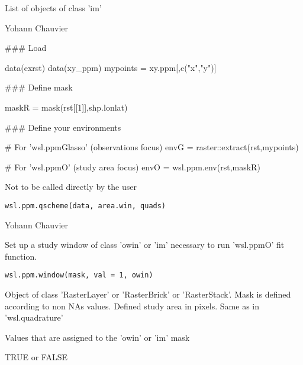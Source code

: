 \documentclass[a4paper]{book}
\begin{document}
%
\begin{Value}
List of objects of class 'im'
\end{Value}
%
\begin{Author}\relax
Yohann Chauvier
\end{Author}
%
\begin{Examples}
\begin{ExampleCode}

### Load

data(exrst)
data(xy_ppm)
mypoints = xy.ppm[,c("x","y")]

### Define mask

maskR = mask(rst[[1]],shp.lonlat)

### Define your environments

   # For 'wsl.ppmGlasso' (observations focus)
envG = raster::extract(rst,mypoints)

   # For 'wsl.ppmO' (study area focus)
envO = wsl.ppm.env(rst,maskR)

\end{ExampleCode}
\end{Examples}
%
\begin{Description}\relax
Not to be called directly by the user
\end{Description}
%
\begin{Usage}
\begin{verbatim}
wsl.ppm.qscheme(data, area.win, quads)
\end{verbatim}
\end{Usage}
%
\begin{Author}\relax
Yohann Chauvier
\end{Author}
%
\begin{Description}\relax
Set up a study window of class 'owin' or 'im' necessary to run 'wsl.ppmO' fit function.
\end{Description}
%
\begin{Usage}
\begin{verbatim}
wsl.ppm.window(mask, val = 1, owin)
\end{verbatim}
\end{Usage}
%
\begin{Arguments}
\begin{ldescription}
\item[\code{mask}] Object of class 'RasterLayer' or 'RasterBrick' or 'RasterStack'. Mask is defined
according to non NAs values. Defined study area in pixels. Same as in 'wsl.quadrature'

\item[\code{val}] Values that are assigned to the 'owin' or 'im' mask

\item[\code{owin}] TRUE or FALSE
\end{ldescription}
\end{Arguments}
\end{document}
